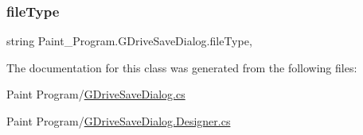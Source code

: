 \subsubsection{\texorpdfstring{file\+Type}{fileType}}
{\footnotesize\ttfamily string Paint\+\_\+\+Program.\+G\+Drive\+Save\+Dialog.\+file\+Type\hspace{0.3cm}{\ttfamily [get]}, {}}



The documentation for this class was generated from the following files\+:\begin{DoxyCompactItemize}
\item 
Paint Program/\mbox{\hyperlink{_g_drive_save_dialog_8cs}{G\+Drive\+Save\+Dialog.\+cs}}\item 
Paint Program/\mbox{\hyperlink{_g_drive_save_dialog_8_designer_8cs}{G\+Drive\+Save\+Dialog.\+Designer.\+cs}}\end{DoxyCompactItemize}
